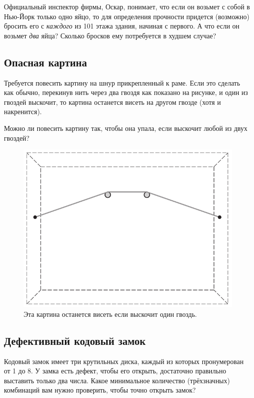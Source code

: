 Официальный инспектор фирмы, Оскар, понимает, что если он возьмет с собой в Нью-Йорк только одно яйцо,
то для определения прочности придется (возможно) бросить его с \emph{каждого} из 101 этажа здания, начиная с первого.
А что если он возьмет \emph{два} яйца?
Сколько бросков ему потребуется в худшем случае?

\subsection*{Опасная картина}

Требуется повесить картину на шнур прикрепленный к раме.
Если это сделать как обычно, перекинув нить через два гвоздя как показано на рисунке, и один из гвоздей выскочит, то картина останется висеть на другом гвозде (хотя и накренится).

Можно ли повесить картину так, чтобы она упала, если выскочит любой из двух гвоздей?

\begin{figure}[h!]
\centering
\includegraphics[scale=0.5]{pics/kartina1}
\caption{Эта картина останется висеть если выскочит один гвоздь.}
\end{figure}

\subsection*{Дефективный кодовый замок}

Кодовый замок имеет три крутильных диска, каждый из которых пронумерован от 1 до 8.
У замка есть дефект, чтобы его открыть, достаточно правильно выставить только два числа.
Какое минимальное количество (трёхзначных) комбинаций вам нужно проверить, чтобы точно открыть замок?

